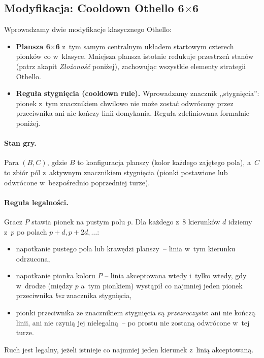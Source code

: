 \documentclass[11pt,a4paper]{article}
\begin{document}
\subsection{Modyfikacja: Cooldown Othello \texorpdfstring{6$\times$6}{6x6}}\label{sec:cooldown-rule}

Wprowadzamy dwie modyfikacje klasycznego Othello:
\begin{itemize}[leftmargin=1.5em,itemsep=2pt]
    \item \textbf{Plansza 6$\times$6} z~tym samym centralnym układem startowym czterech pionków co w~klasyce. Mniejsza plansza istotnie redukuje przestrzeń stanów (patrz akapit \emph{Złożoność} poniżej), zachowując wszystkie elementy strategii Othello.
    \item \textbf{Reguła stygnięcia (cooldown rule).} Wprowadzamy znacznik ,,stygnięcia'': pionek z~tym znacznikiem chwilowo nie może zostać odwrócony przez przeciwnika ani nie kończy linii domykania. Reguła zdefiniowana formalnie poniżej.
\end{itemize}

\paragraph{Stan gry.} Para $(B, C)$, gdzie $B$ to konfiguracja planszy (kolor każdego zajętego pola), a~$C$ to zbiór pól z~aktywnym znacznikiem stygnięcia (pionki postawione lub odwrócone w~bezpośrednio poprzedniej turze).

\paragraph{Reguła legalności.} Gracz $P$ stawia pionek na pustym polu $p$. Dla każdego z~8 kierunków $d$ idziemy z~$p$ po polach $p+d, p+2d, \dots$:
\begin{itemize}[leftmargin=1.5em,itemsep=2pt]
    \item napotkanie pustego pola lub krawędzi planszy~-- linia w~tym kierunku odrzucona,
    \item napotkanie pionka koloru $P$ -- linia akceptowana wtedy i~tylko wtedy, gdy w~drodze (między $p$ a~tym pionkiem) wystąpił co najmniej jeden pionek przeciwnika \emph{bez} znacznika stygnięcia,
    \item pionki przeciwnika ze znacznikiem stygnięcia są \emph{przezroczyste}: ani nie kończą linii, ani nie czynią jej nielegalną~-- po prostu nie zostaną odwrócone w~tej turze.
\end{itemize}
Ruch jest legalny, jeżeli istnieje co najmniej jeden kierunek z~linią akceptowaną.
\end{document}
